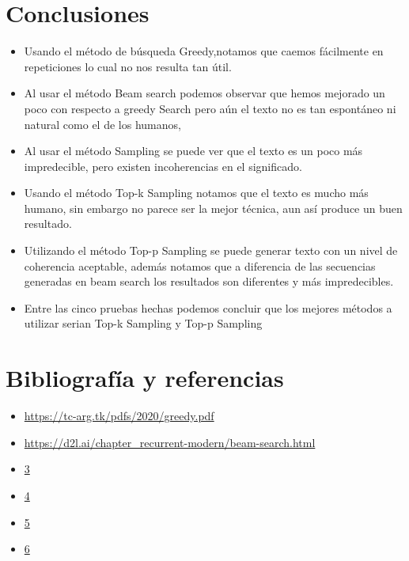 \documentclass[10pt,twocolumn]{article}
\theoremstyle{definition}
\begin{document}
\section{Conclusiones}
\begin{itemize}
    \item Usando el método de búsqueda Greedy,notamos que caemos fácilmente en repeticiones lo cual no nos resulta tan útil.
    \item Al usar el método Beam search podemos observar que hemos mejorado un poco con respecto a greedy Search pero aún el texto no es tan espontáneo ni natural como el de los humanos, 
    \item Al usar el método Sampling se puede ver que el texto es un poco más impredecible, pero existen incoherencias en el significado.
    \item Usando el método Top-k Sampling notamos que el texto es mucho más humano, sin embargo no parece ser la mejor técnica, aun así produce un buen resultado.
    \item Utilizando el método Top-p Sampling se puede generar texto con un nivel de coherencia aceptable, además notamos que a diferencia de las secuencias generadas en beam search los resultados son diferentes y más impredecibles.
    \item Entre las cinco pruebas hechas podemos concluir que los mejores métodos a utilizar serian Top-k Sampling y Top-p Sampling

\end{itemize}

\newpage
\section{Bibliografía y referencias}

\begin{itemize}
    \item \url{https://tc-arg.tk/pdfs/2020/greedy.pdf}
    \item \url{https://d2l.ai/chapter_recurrent-modern/beam-search.html}
    \item \url{3}
    \item \url{4}
    \item \url{5}
    \item \url{6}
\end{itemize}
\end{document}
